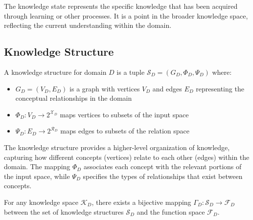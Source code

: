The knowledge state represents the specific knowledge that has been acquired through learning or other processes. It is a point in the broader knowledge space, reflecting the current understanding within the domain.

\subsection{Knowledge Structure}

\begin{definition}
A knowledge structure for domain $D$ is a tuple $\mathcal{S}_D = (G_D, \Phi_D, \Psi_D)$ where:
\begin{itemize}
    \item $G_D = (V_D, E_D)$ is a graph with vertices $V_D$ and edges $E_D$ representing the conceptual relationships in the domain
    \item $\Phi_D: V_D \to 2^{\mathcal{X}_D}$ maps vertices to subsets of the input space
    \item $\Psi_D: E_D \to 2^{\mathcal{R}_D}$ maps edges to subsets of the relation space
\end{itemize}
\end{definition}

The knowledge structure provides a higher-level organization of knowledge, capturing how different concepts (vertices) relate to each other (edges) within the domain. The mapping $\Phi_D$ associates each concept with the relevant portions of the input space, while $\Psi_D$ specifies the types of relationships that exist between concepts.

\begin{theorem}
For any knowledge space $\mathcal{K}_D$, there exists a bijective mapping $\Gamma_D: \mathcal{S}_D \to \mathcal{F}_D$ between the set of knowledge structures $\mathcal{S}_D$ and the function space $\mathcal{F}_D$.
\end{theorem}

